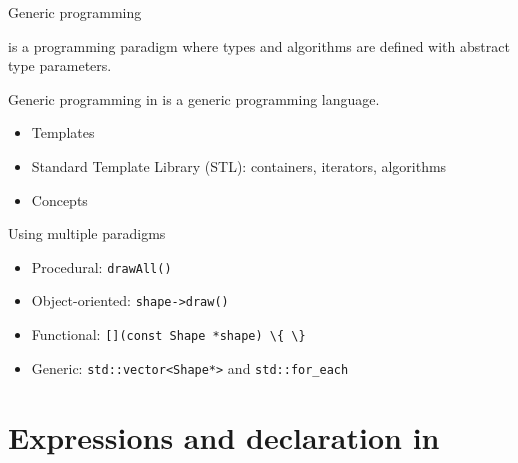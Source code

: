 \begin{frame}{Generic programming}{}
  \begin{definition}
     is a programming paradigm where types and algorithms are defined with abstract type parameters.
  \end{definition}
  \begin{block}{Generic programming in \CCLang}
    \CCLang is a generic programming language.
    \begin{itemize}
    \item
      Templates
    \item
      Standard Template Library (STL): containers, iterators, algorithms
    \item
      Concepts
    \end{itemize}
  \end{block}
\end{frame}

\begin{frame}{Using multiple paradigms}{}
  \begin{example}

    \begin{itemize}
    \item
      Procedural: \lstinline!drawAll()!
    \item
      Object-oriented: \lstinline!shape->draw()!
    \item
      Functional: \lstinline![](const Shape *shape) \{ \}!
    \item
      Generic: \lstinline!std::vector<Shape*>! and \lstinline!std::for_each!
    \end{itemize}
  \end{example}
\end{frame}


\section{Expressions and declaration in \CCLang}

